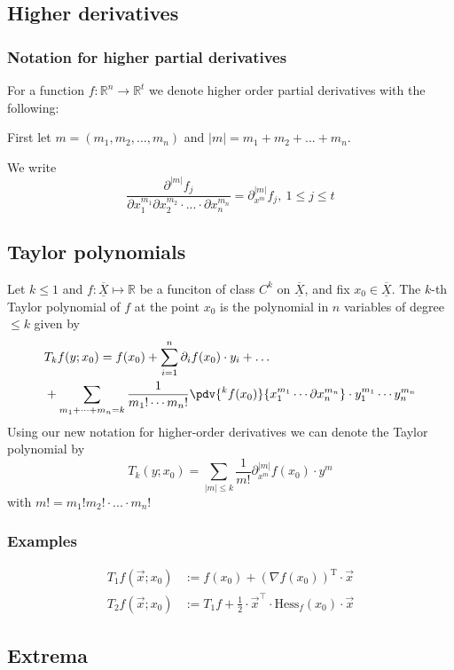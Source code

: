 \documentclass[a4paper,fontsize = 10pt]{article}
\def\R{\mathbb{R}}
\def\X{\underline{\overline{X}}}
\begin{document}
\subsection{Higher derivatives}
\subsubsection*{Notation for higher partial derivatives}
    
For a function $f: \R^n \to \R^t$ we denote higher order partial derivatives with the following:

    First let $m = (m_1, m_2, ..., m_n)$ and $|m| = m_1 + m_2 + ... + m_n$.

    We write
    \[\frac{\partial^{|m|}f_j}{\partial x_1^{m_1} \partial x_2^{m_2} \cdot ... \cdot \partial x_n^{m_n}} = \partial_{x^m}^{|m|}f_j, \ 1 \leq j \leq t\]

\subsection{Taylor polynomials}
Let \(k \le 1\) and \(f: \X \mapsto \R\) be a funciton of class \(C^k\) on \(\X\), and fix \(x_0 \in \X\). The \(k\)-th Taylor polynomial of \(f\) at the point \(x_0\) is the polynomial in \(n\) variables of degree \(\le k\) given by
\begin{align*}
  &T_k f(y; x_0) = f(x_0) + \sum_{i=1}^n \partial_i f(x_0) \cdot y_i + \dots \\
  &+ \sum_{m_1 + \cdots + m_n = k} \frac{1}{m_1! \cdots m_n!} \pdv{^k f(x_0) }{x_1^{m_1} \cdots \partial x_n^{m_n}} \cdot y_1^{m_1} \cdots y_n^{m_n}
\end{align*}
Using our new notation for higher-order derivatives we can denote the Taylor polynomial by
\[T_k(y; x_0) = \sum_{|m| \leq k} \frac{1}{m!}\partial_{x^m}^{|m|}f(x_0)\cdot y^m\]
with $m! = m_1!m_2!\cdot ... \cdot m_n!$

\subsubsection*{Examples}
\begin{align*}
  T_1 f(\vec{x}; x_0) &:= f(x_0) + (\nabla f(x_0))^{\text{T}} \cdot \vec{x} \\
  T_2 f(\vec{x}; x_0) &:= T_1f + \frac{1}{2} \cdot \vec{x}^\top \cdot \text{Hess}_f(x_0) \cdot \vec{x}
\end{align*}


\subsection{Extrema}
\end{document}
